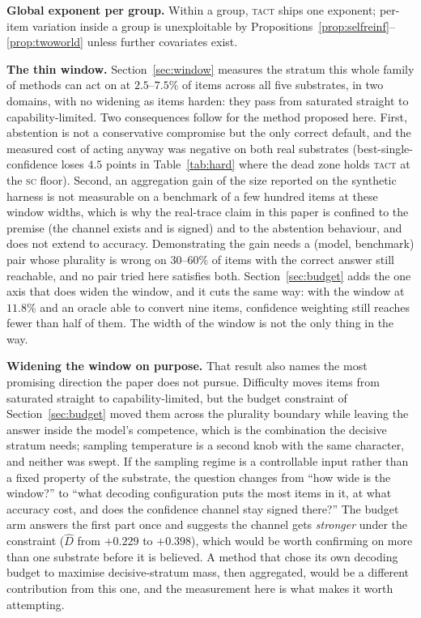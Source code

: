 \documentclass[twoside,11pt]{article}
\newcommand{\Dhat}{\widehat{D}}
\newcommand{\SC}{\textsc{sc}}
\newcommand{\TACT}{\textsc{tact}}
\begin{document}
\textbf{Global exponent per group.} Within a group, \TACT{} ships one exponent; per-item variation inside a group is unexploitable by Propositions~\ref{prop:selfreinf}--\ref{prop:twoworld} unless further covariates exist.

\textbf{The thin window.} Section~\ref{sec:window} measures the stratum this
whole family of methods can act on at $2.5$--$7.5\%$ of items across all five
substrates, in two domains, with no widening as items harden: they pass from
saturated straight to capability-limited. Two consequences follow for the
method proposed here. First, abstention is not a conservative compromise but
the only correct default, and the measured cost of acting anyway was negative
on both real substrates (best-single-confidence loses $4.5$ points in
Table~\ref{tab:hard} where the dead zone holds \TACT{} at the \SC{} floor).
Second, an aggregation gain of the size reported on the synthetic harness is
not measurable on a benchmark of a few hundred items at these window widths,
which is why the real-trace claim in this paper is confined to the premise
(the channel exists and is signed) and to the abstention behaviour, and does
not extend to accuracy. Demonstrating the gain needs a (model, benchmark)
pair whose plurality is wrong on $30$--$60\%$ of items with the correct answer
still reachable, and no pair tried here satisfies both.
Section~\ref{sec:budget} adds the one axis that does widen the window, and it
cuts the same way: with the window at $11.8\%$ and an oracle able to convert
nine items, confidence weighting still reaches fewer than half of them. The
width of the window is not the only thing in the way.

\textbf{Widening the window on purpose.} That result also names the most
promising direction the paper does not pursue. Difficulty moves items from
saturated straight to capability-limited, but the budget constraint of
Section~\ref{sec:budget} moved them across the plurality boundary while leaving
the answer inside the model's competence, which is the combination the decisive
stratum needs; sampling temperature is a second knob with the same character,
and neither was swept. If the sampling regime is a controllable input rather
than a fixed property of the substrate, the question changes from ``how wide is
the window?'' to ``what decoding configuration puts the most items in it, at
what accuracy cost, and does the confidence channel stay signed there?'' The
budget arm answers the first part once and suggests the channel gets
\emph{stronger} under the constraint ($\Dhat$ from $+0.229$ to $+0.398$), which
would be worth confirming on more than one substrate before it is believed. A
method that chose its own decoding budget to maximise decisive-stratum mass,
then aggregated, would be a different contribution from this one, and the
measurement here is what makes it worth attempting.
\end{document}
